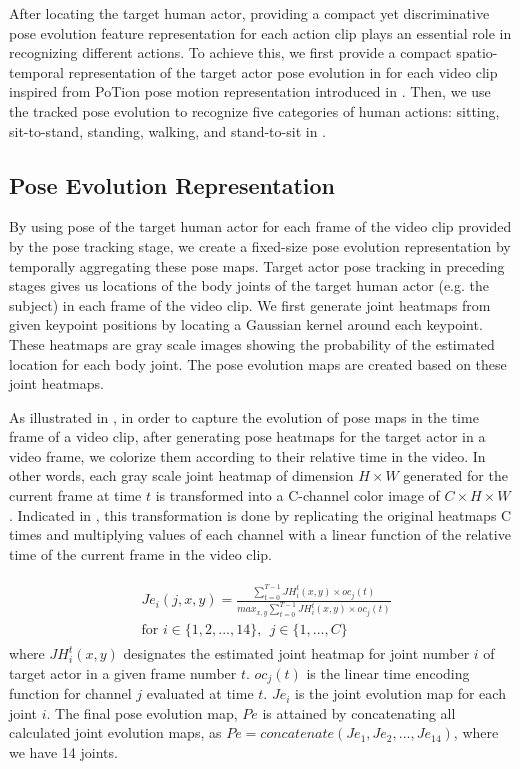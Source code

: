 

After locating the target human actor, providing a compact yet discriminative pose evolution feature representation for each action clip plays an essential role in recognizing different actions. To achieve this, we first provide a compact spatio-temporal representation of the target actor pose evolution in  for each video clip inspired from PoTion pose motion representation introduced in \cite{choutas2018potion}. Then, we use the tracked pose evolution to recognize five categories of human actions: sitting, sit-to-stand, standing, walking, and stand-to-sit in .

\subsection{Pose Evolution Representation}
\label{sec:potion}
By using pose of the target human actor for each frame of the video clip provided by the pose tracking stage, we create a fixed-size pose evolution representation by temporally aggregating these pose maps. Target actor pose tracking in preceding stages gives us locations of the body joints of the target human actor (e.g. the subject) in each frame of the video clip. We first generate joint heatmaps from given keypoint positions by locating a Gaussian kernel around each keypoint. These heatmaps are gray scale images showing the probability of the estimated location for each body joint. The pose evolution maps are created based on these joint heatmaps. 

As illustrated in , in order to capture the evolution of pose maps in the time frame of a video clip, after generating pose heatmaps for the target actor in a video frame, we colorize them according to their relative time in the video. In other words, each gray scale joint heatmap of dimension $H \times W$ generated for the current frame at time $t$ is transformed into a C-channel color image of $C \times H \times W$. Indicated in , this transformation is done by replicating the original heatmaps C times and multiplying values of each channel with a linear function of the relative time of the current frame in the video clip. 

\peseEvolution

\begin{align} \label{eqn:poseEv}
\begin{split}
   & Je_i(j, x, y) = \frac{\sum_{t=0}^{T-1} JH_i^t(x, y) \times oc_j(t)}{max_{x, y} \sum_{t=0}^{T-1} JH_i^t(x, y) \times oc_j(t) } \\
   & \text{for } i \in \{1, 2, ..., 14\},~~ j \in \{1, ..., C \} 
\end{split}  
\end{align}
%
where $JH_i^t(x, y)$ designates the estimated joint heatmap for joint number $i$ of target actor in a given frame number $t$. $oc_j(t)$ is the linear time encoding function for channel $j$ evaluated at time $t$. $Je_i$ is the joint evolution map for each joint $i$. The final pose evolution map, $Pe$ is attained by concatenating all calculated joint evolution maps, as $Pe = concatenate(Je_1, Je_2, ..., Je_{14})$, where we have 14 joints.

